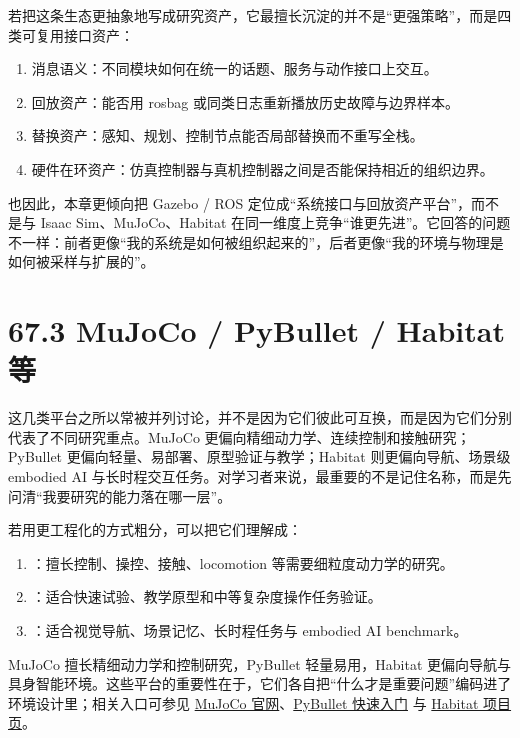 若把这条生态更抽象地写成研究资产，它最擅长沉淀的并不是“更强策略”，而是四类可复用接口资产：

\begin{enumerate}
\item 消息语义：不同模块如何在统一的话题、服务与动作接口上交互。
\item 回放资产：能否用 rosbag 或同类日志重新播放历史故障与边界样本。
\item 替换资产：感知、规划、控制节点能否局部替换而不重写全栈。
\item 硬件在环资产：仿真控制器与真机控制器之间是否能保持相近的组织边界。
\end{enumerate}

也因此，本章更倾向把 Gazebo / ROS 定位成“系统接口与回放资产平台”，而不是与 Isaac Sim、MuJoCo、Habitat 在同一维度上竞争“谁更先进”。它回答的问题不一样：前者更像“我的系统是如何被组织起来的”，后者更像“我的环境与物理是如何被采样与扩展的”。

\section*{67.3 MuJoCo / PyBullet / Habitat 等}


这几类平台之所以常被并列讨论，并不是因为它们彼此可互换，而是因为它们分别代表了不同研究重点。MuJoCo 更偏向精细动力学、连续控制和接触研究；PyBullet 更偏向轻量、易部署、原型验证与教学；Habitat 则更偏向导航、场景级 embodied AI 与长时程交互任务。对学习者来说，最重要的不是记住名称，而是先问清“我要研究的能力落在哪一层”。

若用更工程化的方式粗分，可以把它们理解成：

\begin{enumerate}
\item \texttt{}：擅长控制、操控、接触、locomotion 等需要细粒度动力学的研究。
\item \texttt{}：适合快速试验、教学原型和中等复杂度操作任务验证。
\item \texttt{}：适合视觉导航、场景记忆、长时程任务与 embodied AI benchmark。
\end{enumerate}

MuJoCo 擅长精细动力学和控制研究，PyBullet 轻量易用，Habitat 更偏向导航与具身智能环境。这些平台的重要性在于，它们各自把“什么才是重要问题”编码进了环境设计里；相关入口可参见 \href{https://mujoco.org/}{MuJoCo 官网}、\href{https://pybullet.org/wordpress/}{PyBullet 快速入门} 与 \href{https://aihabitat.org/}{Habitat 项目页}。


